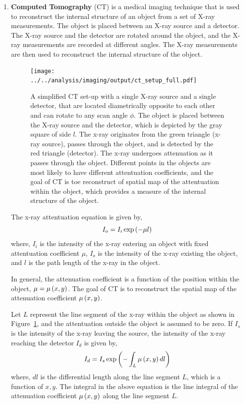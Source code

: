 \documentclass[12pt]{article}
\def\lp{\ensuremath\left(}
\def\rp{\ensuremath\right)}
\newcommand{\ct}[1]{\lp #1\rp}
\begin{document}
\begin{enumerate}
\item \textbf{Computed Tomography} (CT) is a medical imaging technique that is used to reconstruct the internal structure of an object from a set of X-ray measurements. The object is placed between an X-ray source and a detector. The X-ray source and the detector are rotated around the object, and the X-ray measurements are recorded at different angles. The X-ray measurements are then used to reconstruct the internal structure of the object.
\begin{figure}[h]
    \centering
    \texttt{[image: ../../analysis/imaging/output/ct\_setup\_full.pdf]}
    \caption{A simplified CT set-up with a single X-ray source and a single detector, that are located diametrically opposite to each other and can rotate to any scan angle $\phi$. The object is placed between the X-ray source and the detector, which is depicted by the gray square of side $l$. The x-ray originates from the green triangle (x-ray source), passes through the object, and is detected by the red triangle (detector). The x-ray undergoes attenuation as it passes through the object. Different points in the objects are most likely to have different attentuation coefficients, and the goal of CT is toe reconstruct of spatial map of the attentuation within the object, which provides a measure of the internal structure of the object.}
    \label{fig:ct}
\end{figure}

The x-ray attentuation equation is given by,
\[ I_o = I_i \exp\lp -\mu l \rp \]
where, $I_i$ is the intensity of the x-ray entering an object with fixed attentuation coefficient $\mu$, $I_o$ is the intensity of the x-ray existing the object, and $l$ is the path length of the x-ray in the object. 

In general, the attenuation coefficient is a function of the position within the object, $\mu = \mu\ct{x,y}$. The goal of CT is to reconstruct the spatial map of the attenuation coefficient $\mu\ct{x,y}$.

Let $L$ represent the line segment of the x-ray within the object as shown in Figure~\ref{fig:ct}, and the attentuation outside the object is assumed to be zero. If $I_s$ is the intensity of the x-ray leaving the source, the intensity of the x-ray reaching the detector $I_d$ is given by,
\[ I_d = I_s \exp\lp - \int_L \mu \ct{x, y} dl \rp \]
where, $dl$ is the differential length along the line segment $L$, which is a function of $x, y$. The integral in the above equation is the line integral of the attenuation coefficient $\mu\ct{x,y}$ along the line segment $L$.


\end{enumerate}
\end{document}

